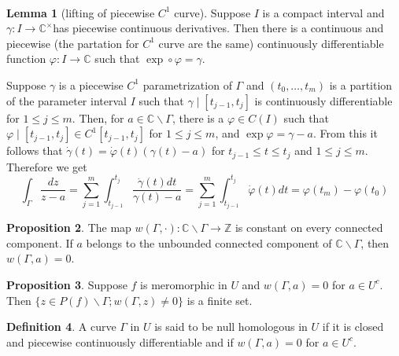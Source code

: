 \documentclass[12pt,a4paper]{book}
\newenvironment{prooff}{{\noindent\it\textcolor{cyan!40!black}{Proof}:}\,}{\par}
\newenvironment{enu}{\begin{enumerate}[(1)]}{\end{enumerate}}
\theoremstyle{definition}
\newtheorem{defn}{Definition}[section]
\newtheorem{lem}[defn]{Lemma}
\newtheorem{prop}[defn]{Proposition}
\begin{document}
\begin{prooff}
    \begin{lem}[lifting of piecewise $C^1$ curve]
Suppose $I$ is a compact interval and $\gamma: I \rightarrow \mathbb{C}^{\times}$has piecewise continuous derivatives. 
Then there is a continuous and piecewise (the partation for $C^1$ curve are the same) continuously differentiable function $\varphi: I \rightarrow \mathbb{C}$ such that $\exp \circ \varphi=\gamma$.
    \end{lem}
    Suppose $\gamma$ is a piecewise $C^1$ parametrization of $\Gamma$ and $\left(t_0, \ldots, t_m\right)$ is a partition of the parameter interval $I$ such that $\gamma \mid\left[t_{j-1}, t_j\right]$ is continuously differentiable for $1 \leq j \leq m$. 
Then, for $a \in \mathbb{C} \backslash \Gamma$, there is
a $\varphi \in C(I)$ such that $\varphi \mid\left[t_{j-1}, t_j\right] \in C^1\left[t_{j-1}, t_j\right]$ for $1 \leq j \leq m$, 
and $\exp\varphi=\gamma-a$. 
From this it follows that $\dot{\gamma}(t)=\dot{\varphi}(t)(\gamma(t)-a)$ for $t_{j-1} \leq t \leq t_j$ and $1 \leq j \leq m$. Therefore we get
$$
\int_{\Gamma} \frac{d z}{z-a}=\sum_{j=1}^m \int_{t_{j-1}}^{t_j} \frac{\dot{\gamma}(t) d t}{\gamma(t)-a}=\sum_{j=1}^m \int_{t_{j-1}}^{t_j} \dot{\varphi}(t) d t=\varphi\left(t_m\right)-\varphi\left(t_0\right)
$$
\end{prooff}
\begin{prop}
    The map $w(\Gamma, \cdot): \mathbb{C} \backslash \Gamma \rightarrow \mathbb{Z}$ is constant on every connected component. If $a$ belongs to the unbounded connected component of $\mathbb{C} \backslash\Gamma$, then $w(\Gamma, a)=0$.
\end{prop}
\begin{prop}
    Suppose $f$ is meromorphic in $U$ and $w(\Gamma, a)=0$ for $a \in U^c$. Then $\{z \in P(f) \backslash \Gamma ; w(\Gamma, z) \neq 0\}$ is a finite set.
\end{prop}
\begin{defn}
A curve $\Gamma$ in $U$ is said to be null homologous in $U$ if it is closed and piecewise continuously differentiable and if $w(\Gamma, a)=0$ for $a \in U^c.$
\end{defn}
\end{document}
